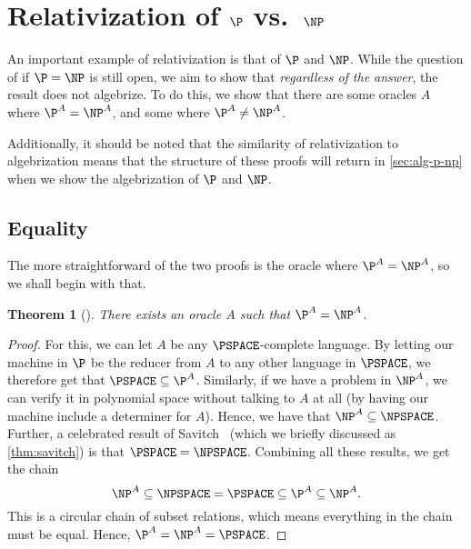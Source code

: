 \documentclass[english]{reedthesis}
\theoremstyle{plain}
\newtheorem{thm}{Theorem}[section]
\theoremstyle{definition}
\theoremstyle{remark}
\begin{document}
\section{Relativization of $\P$ vs.\ $\NP$}\label{sec:rel-p-np}

An important example of relativization is that of $\P$ and $\NP$. While the
question of if $\P = \NP$ is still open, we aim to show that \emph{regardless of
the answer}, the result does not algebrize. To do this, we show that there are
some oracles $A$ where $\P^{A} = \NP^{A}$, and some where $\P^{A} \ne \NP^{A}$.

Additionally, it should be noted that the similarity of relativization to
algebrization means that the structure of these proofs will return in
\cref{sec:alg-p-np} when we show the algebrization of $\P$ and $\NP$.

\subsection{Equality}

The more straightforward of the two proofs is the oracle where
$\P^{A} = \NP^{A}$, so we shall begin with that.

\begin{thm}[{\cite[Theorem 2]{BGS75}}]\label{thm:p-np-rel}
  There exists an oracle $A$ such that $\P^{A} = \NP^{A}$.
\end{thm}

\begin{proof}
  For this, we can let $A$ be any $\PSPACE$-complete language. By letting our
  machine in $\P$ be the reducer from $A$ to any other language in $\PSPACE$, we
  therefore get that $\PSPACE \subseteq \P^{A}$. Similarly, if we have a problem in
  $\NP^{A}$, we can verify it in polynomial space without talking to $A$ at all
  (by having our machine include a determiner for $A$). Hence, we have that
  $\NP^{A} \subseteq \NPSPACE$. Further, a celebrated result of Savitch~\cite{Sav70}
  (which we briefly discussed as \cref{thm:savitch}) is that
  $\PSPACE = \NPSPACE$. Combining all these results, we get the chain
  \begin{equation}
    \NP^{A} \subseteq \NPSPACE = \PSPACE \subseteq \P^{A} \subseteq \NP^{A}.
  \end{equation}
  This is a circular chain of subset relations, which means everything in the
  chain must be equal. Hence, $\P^{A} = \NP^{A} = \PSPACE$.
\end{proof}
\end{document}
